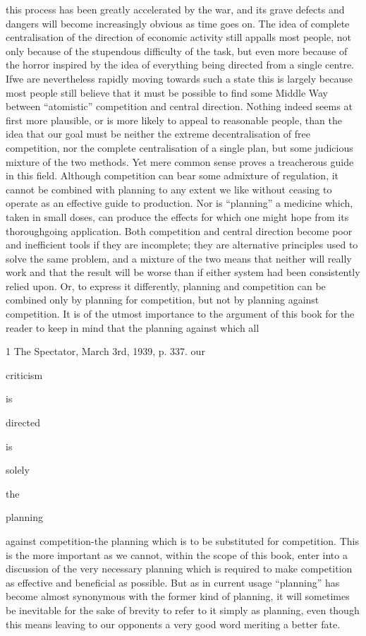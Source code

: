 \documentclass[11pt,openany]{book}
\begin{document}
this process has been greatly accelerated by the war, and its grave defects and dangers will become increasingly obvious as time goes on. The idea of complete centralisation of the direction of economic activity still appalls most people, not only because of the stupendous difficulty of the task, but even more because of the horror inspired by the idea of everything being directed from a single centre. Ifwe are nevertheless rapidly moving towards such a state this is largely because most people still believe that it must be possible to find some Middle Way between ``atomistic'' competition and central direction. Nothing indeed seems at first more plausible, or is more likely to appeal to reasonable people, than the idea that our goal must be neither the extreme decentralisation of free competition, nor the complete centralisation of a single plan, but some judicious mixture of the two methods. Yet mere common sense proves a treacherous guide in this field. Although competition can bear some admixture of regulation, it cannot be combined with planning to any extent we like without ceasing to operate as an effective guide to production. Nor is ``planning'' a medicine which, taken in small doses, can produce the effects for which one might hope from its thoroughgoing application. Both competition and central direction become poor and inefficient tools if they are incomplete; they are alternative principles used to solve the same problem, and a mixture of the two means that neither will really work and that the result will be worse than if either system had been consistently relied upon. Or, to express it differently, planning and competition can be combined only by planning for competition, but not by planning against competition. It is of the utmost importance to the argument of this book for the reader to keep in mind that the planning against which all

1 The Spectator, March 3rd, 1939, p. 337. our

criticism

is

directed

is

solely

the

planning

against competition-the planning which is to be substituted for competition. This is the more important as we cannot, within the scope of this book, enter into a discussion of the very necessary planning which is required to make competition as effective and beneficial as possible. But as in current usage ``planning'' has become almost synonymous with the former kind of planning, it will sometimes be inevitable for the sake of brevity to refer to it simply as planning, even though this means leaving to our opponents a very good word meriting a better fate.
\end{document}

